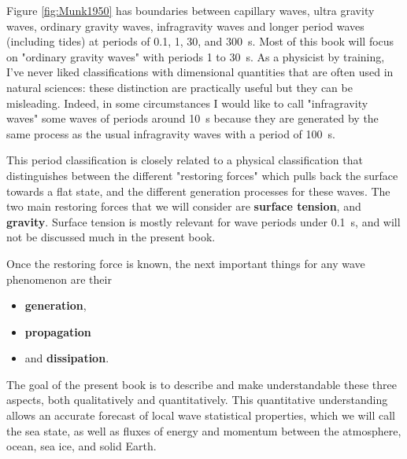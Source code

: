 Figure \ref{fig:Munk1950} has boundaries between capillary waves, ultra gravity waves, ordinary gravity waves, infragravity waves and longer period waves (including tides) at periods of 0.1, 1, 30, and 300~s. Most of this book will focus on "ordinary gravity waves" with periods 1 to 30~s. As a physicist by training, I've never liked classifications with dimensional quantities that are often used in natural sciences: these distinction are practically useful but they can be misleading.  Indeed, in some circumstances I would like to call "infragravity waves" some waves of periods around 10~s because they are generated by the same process as the usual infragravity waves with a period of 100~s. 

This period classification is closely related to a physical classification that distinguishes 
between the different  "restoring forces" which pulls back the surface towards a flat state, and the different generation processes for these waves. 
The two main restoring forces that we will consider are  \textbf{surface tension}, and \textbf{gravity}. Surface tension is mostly relevant for wave periods under 0.1~s, and will not be discussed much in the present book.

Once the restoring force is known, the next important things for any wave phenomenon are their
\begin{itemize}
          \item \textbf{generation},
          \item \textbf{propagation} 
          \item and \textbf{dissipation}.
         \end{itemize}
The goal of the present book is to describe and make understandable these 
three aspects, both qualitatively and quantitatively. 
This quantitative understanding allows an accurate forecast of local wave statistical properties, which we will 
call the sea state, as well as fluxes of energy and momentum between the atmosphere, ocean, sea ice, and solid Earth. 


